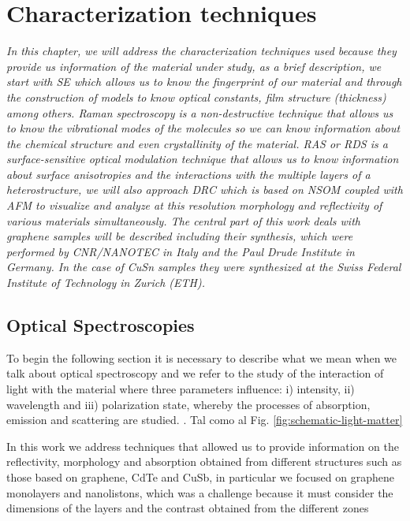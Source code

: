 \begin{center}
	
\end{center}\textbf{}\chapter{Characterization techniques }
\label{chap:chap2}
\textit{In this chapter, we will address the characterization techniques used because they provide us information of the material under study, as a brief description, we start with SE which allows us to know the fingerprint of our material and through the construction of models to know optical constants, film structure (thickness) among others. Raman spectroscopy is a non-destructive technique that allows us to know the vibrational modes of the molecules so we can know information about the chemical structure and even crystallinity of the material. RAS or RDS is a surface-sensitive optical modulation technique that allows us to know  information about surface anisotropies and the interactions with the multiple layers of a heterostructure, we will also approach DRC which is based on NSOM coupled with AFM to visualize and analyze at this resolution morphology and reflectivity of various materials simultaneously. The central part of this work deals with graphene samples will be described including their synthesis, which were performed by CNR/NANOTEC in Italy and the Paul Drude Institute in Germany. In the case of CuSn samples they were synthesized at the Swiss Federal Institute of Technology in Zurich (ETH).}
\vfill
\minitoc
\newpage

\allowdisplaybreaks

\section{Optical Spectroscopies}
\vspace{-1.3cm}
To begin the following section it is necessary to describe what we mean when we talk about optical spectroscopy and we refer to the study of the interaction of light with the material where three parameters influence: i) intensity, ii) wavelength and iii) polarization state, whereby the processes of absorption, emission and scattering are studied. \cite{ionita2014condensed}. Tal como al Fig. \ref*{fig:schematic-light-matter}

In this work we address techniques that allowed us to provide information on the reflectivity, morphology and absorption obtained from different structures such as those based on graphene, CdTe and CuSb, in particular we focused on graphene monolayers and nanolistons, which was a challenge because it must consider the dimensions of the layers and the contrast obtained from the different zones

